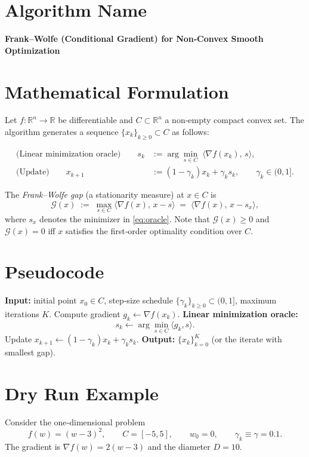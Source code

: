 \documentclass{article}
\newcommand{\gap}{\mathcal{G}}
\begin{document}
\section*{Algorithm Name}
\textbf{Frank–Wolfe (Conditional Gradient) for Non‑Convex Smooth Optimization}

\section*{Mathematical Formulation}
Let $f:\mathbb{R}^n\rightarrow\mathbb{R}$ be differentiable and $C\subset\mathbb{R}^n$ a non‑empty compact convex set.
The algorithm generates a sequence $\{x_k\}_{k\ge 0}\subset C$ as follows:

\begin{align}
\text{(Linear minimization oracle)}\qquad
s_k &:= \arg\min_{s\in C}\;\langle \nabla f(x_k),\,s\rangle ,\label{eq:oracle}\\[4pt]
\text{(Update)}\qquad
x_{k+1} &:= (1-\gamma_k)x_k + \gamma_k s_k ,\qquad \gamma_k\in(0,1].\label{eq:update}
\end{align}

The \emph{Frank–Wolfe gap} (a stationarity measure) at $x\in C$ is
\[
\gap(x) \;:=\; \max_{s\in C}\langle \nabla f(x),\,x-s\rangle
               \;=\;\langle \nabla f(x),\,x-s_x\rangle,
\]
where $s_x$ denotes the minimizer in \eqref{eq:oracle}.  Note that $\gap(x)\ge 0$ and $\gap(x)=0$ iff $x$ satisfies the first‑order optimality condition over $C$.

\section*{Pseudocode}
\begin{algorithm}[H]
\caption{Frank–Wolfe for non‑convex $f$}
\begin{algorithmic}[1]
\State \textbf{Input:} initial point $x_0\in C$, step‑size schedule $\{\gamma_k\}_{k\ge0}\subset(0,1]$, maximum iterations $K$.
    \State Compute gradient $g_k \gets \nabla f(x_k)$.
    \State \textbf{Linear minimization oracle:}
          \[
          s_k \gets \arg\min_{s\in C}\langle g_k, s\rangle .
          \]
    \State Update $x_{k+1} \gets (1-\gamma_k)x_k + \gamma_k s_k$.
\EndFor
\State \textbf{Output:} $\{x_k\}_{k=0}^K$ (or the iterate with smallest gap).
\end{algorithmic}
\end{algorithm}

\section*{Dry Run Example}
Consider the one‑dimensional problem
\[
f(w) = (w-3)^2,\qquad C=[-5,5],\qquad w_0=0,\qquad \gamma_k\equiv\gamma=0.1.
\]
The gradient is $\nabla f(w)=2(w-3)$ and the diameter $D=10$.
\end{document}
